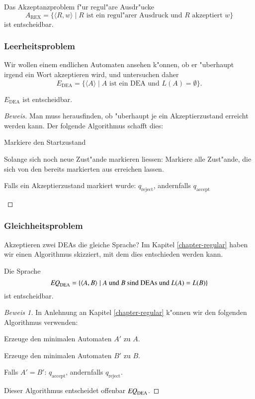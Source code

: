 \begin{satz} Das Akzeptanzproblem f"ur regul"are Ausdr"ucke
\[
A_{\text{REX}}=\{
\langle R,w\rangle\;|\;\text{$R$ ist ein regul"arer Ausdruck und $R$ akzeptiert $w$}
\}
\]
ist entscheidbar.
\end{satz}

\subsubsection{Leerheitsproblem}
Wir wollen einem endlichen Automaten ansehen k"onnen, ob er "uberhaupt
irgend ein Wort akzeptieren wird, und untersuchen daher
\[
E_{\text{DEA}}
=\{
\langle A\rangle \;|\;\text{$A$  ist ein DEA und $L(A)=\emptyset$}
\}.
\]
\begin{satz}
$E_{\text{DEA}}$
ist entscheidbar.
\end{satz}

\begin{proof}[Beweis]
Man muss herausfinden, ob "uberhaupt je ein Akzeptierzustand erreicht
werden kann.
Der folgende Algorithmus schafft dies:
\medskip
\begin{compactenum}
\item Markiere den Startzustand
\item Solange sich noch neue Zust"ande markieren liessen:
 Markiere alle Zust"ande, die sich von den bereits markierten aus
erreichen lassen.
\item Falls ein Akzeptierzustand markiert wurde: $q_{\text{reject}}$,
andernfalls
$q_{\text{accept}}$
\end{compactenum}
\medskip
\end{proof}

\subsubsection{Gleichheitsproblem}
Akzeptieren zwei DEAs die gleiche Sprache? Im Kapitel \ref{chapter-regular}
haben wir einen Algorithmus skizziert, mit dem dies entschieden werden kann.

\begin{satz}
\label{satz:eqdea}
Die Sprache
\[
\text{\it EQ}_{\text{DEA}}=\{
\langle A,B\rangle\;|\;\text{$A$ und $B$ sind DEAs und $L(A)=L(B)$}
\}
\]
ist entscheidbar.
\end{satz}

\begin{proof}[Beweis 1]
In Anlehnung an Kapitel \ref{chapter-regular} k"onnen wir den folgenden
Algorithmus verwenden:
\medskip
\begin{compactenum}
\item Erzeuge den minimalen Automaten $A'$ zu $A$.
\item Erzeuge den minimalen Automaten $B'$ zu $B$.
\item Falls $A'=B'$: $q_{\text{accept}}$, andernfalls $q_{\text{reject}}$.
\end{compactenum}
\medskip
Dieser Algorithmus entscheidet offenbar 
$\text{\it EQ}_{\text{DEA}}$.
\end{proof}


